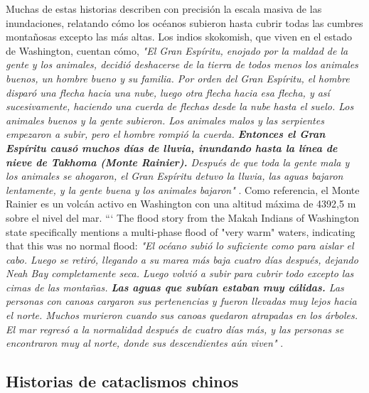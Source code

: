 \documentclass[10pt,twocolumn,letterpaper]{article}
\begin{document}
Muchas de estas historias describen con precisión la escala masiva de las inundaciones, relatando cómo los océanos subieron hasta cubrir todas las cumbres montañosas excepto las más altas. Los indios skokomish, que viven en el estado de Washington, cuentan cómo, \textit{"El Gran Espíritu, enojado por la maldad de la gente y los animales, decidió deshacerse de la tierra de todos menos los animales buenos, un hombre bueno y su familia. Por orden del Gran Espíritu, el hombre disparó una flecha hacia una nube, luego otra flecha hacia esa flecha, y así sucesivamente, haciendo una cuerda de flechas desde la nube hasta el suelo. Los animales buenos y la gente subieron. Los animales malos y las serpientes empezaron a subir, pero el hombre rompió la cuerda. \textbf{Entonces el Gran Espíritu causó muchos días de lluvia, inundando hasta la línea de nieve de Takhoma (Monte Rainier).} Después de que toda la gente mala y los animales se ahogaron, el Gran Espíritu detuvo la lluvia, las aguas bajaron lentamente, y la gente buena y los animales bajaron"} \cite{3}. Como referencia, el Monte Rainier es un volcán activo en Washington con una altitud máxima de 4392,5 m sobre el nivel del mar.
```
The flood story from the Makah Indians of Washington state specifically mentions a multi-phase flood of "very warm" waters, indicating that this was no normal flood: \textit{"El océano subió lo suficiente como para aislar el cabo. Luego se retiró, llegando a su marea más baja cuatro días después, dejando Neah Bay completamente seca. Luego volvió a subir para cubrir todo excepto las cimas de las montañas. \textbf{Las aguas que subían estaban muy cálidas.} Las personas con canoas cargaron sus pertenencias y fueron llevadas muy lejos hacia el norte. Muchos murieron cuando sus canoas quedaron atrapadas en los árboles. El mar regresó a la normalidad después de cuatro días más, y las personas se encontraron muy al norte, donde sus descendientes aún viven"} \cite{3}.

\subsection{Historias de cataclismos chinos}
\end{document}

